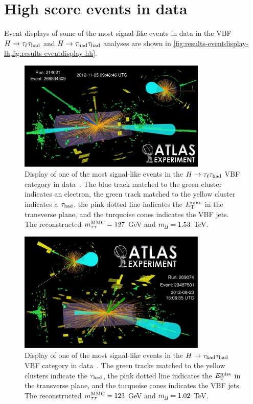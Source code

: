\section{High score events in data}

Event displays of some of the most signal-like events in data in the VBF $H\rightarrow\tau_\ell\tau_\text{had}$ and $H\rightarrow\tau_\text{had}\tau_\text{had}$ analyses are shown in \cref{fig:results-eventdisplay-lh,fig:results-eventdisplay-hh}.

\begin{figure}[tp]
  \centering
  \includegraphics[width=0.80\textwidth]{figures/HIGG-2013-32/figaux_19}
  \caption{Display of one of the most signal-like events in the $H\rightarrow\tau_\ell\tau_\text{had}$ VBF category in data~\cite{HIGG-2013-32}. The blue track matched to the green cluster indicates an electron, the green track matched to the yellow cluster indicates a $\tau_\text{had}$, the pink dotted line indicates the $E_{\mathrm{T}}^{\mathrm{miss}}$ in the transverse plane, and the turquoise cones indicates the VBF jets. The reconstructed $m_{\tau\tau}^\text{MMC} = 127$ GeV and $m_{\text{jj}} = 1.53$ TeV.}
  \label{fig:results-eventdisplay-lh}
\end{figure}

\begin{figure}[tp]
  \centering
  \includegraphics[width=0.80\textwidth]{figures/HIGG-2013-32/figaux_20}
  \caption{Display of one of the most signal-like events in the $H\rightarrow\tau_\text{had}\tau_\text{had}$ VBF category in data~\cite{HIGG-2013-32}. The green tracks matched to the yellow clusters indicate the $\tau_\text{had}$, the pink dotted line indicates the $E_{\mathrm{T}}^{\mathrm{miss}}$ in the transverse plane, and the turquoise cones indicates the VBF jets. The reconstructed $m_{\tau\tau}^\text{MMC} = 123$ GeV and $m_{\text{jj}} = 1.02$ TeV.}
  \label{fig:results-eventdisplay-hh}
\end{figure}

